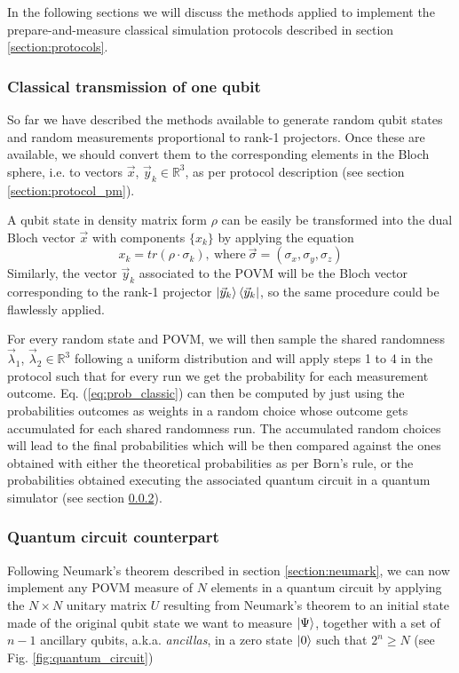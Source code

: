 In the following sections we will discuss the methods applied to implement the prepare-and-measure classical simulation protocols described in section \ref{section:protocols}.
\subsubsection{Classical transmission of one qubit}
So far we have described the methods available to generate random qubit states and random measurements proportional to rank-1 projectors. Once these are available, we should convert them to the corresponding elements in the Bloch sphere, i.e. to vectors $\vec{x}$, ${\vec{y}_k} \in \mathbb{R}^3$, as per protocol description (see section \ref{section:protocol_pm}). 

A qubit state in density matrix form $\rho$ can be easily be transformed into the dual Bloch vector $\vec{x}$ with components $\{x_k\}$ by applying the equation
\begin{equation}
    x_k = tr(\rho \cdot \sigma_k),\ \text{where}\ \vec{\sigma} = (\sigma_x, \sigma_y, \sigma_z)
\end{equation}
Similarly, the vector ${\vec{y}_k}$ associated to the POVM will be the Bloch vector corresponding to the rank-1 projector $ \ket{\vec{y}_k} \bra{\vec{y}_k}$, so the same procedure could be flawlessly applied.

For every random state and POVM, we will then sample the shared randomness $\vec{\lambda}_1$, $\vec{\lambda}_2 \in \mathbb{R}^3$ following a uniform distribution and will apply steps 1 to 4 in the protocol such that for every run we get the probability for each measurement outcome. Eq. (\ref{eq:prob_classic}) can then be computed by just using the probabilities outcomes as weights in a random choice whose outcome gets accumulated for each shared randomness run. The accumulated random choices will lead to the final probabilities which will be then compared against the ones obtained with either the theoretical probabilities as per Born's rule, or the probabilities obtained executing the associated quantum circuit in a quantum simulator (see section \ref{section:quantum_circuit}).

\subsubsection{Quantum circuit counterpart}\label{section:quantum_circuit}
Following Neumark's theorem described in section \ref{section:neumark}, we can now implement any POVM measure of $N$ elements in a quantum circuit by applying the $N\times N$ unitary matrix $U$ resulting from Neumark's theorem to an initial state made of the original qubit state we want to measure $\ket{\Psi}$, together with a set of $n-1$ ancillary qubits, a.k.a. \textit{ancillas}, in a zero state $\ket{0}$ such that $2^n \ge N$ (see Fig. \ref{fig:quantum_circuit}) 

